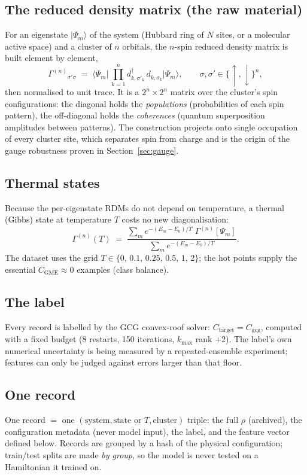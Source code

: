 \documentclass[11pt]{article}
\newcommand{\CGME}{\ensuremath{C_{\mathrm{GME}}}}
\newcommand{\rdm}{\ensuremath{\Gamma^{(n)}}}
\begin{document}
\subsection{The reduced density matrix (the raw material)}
For an eigenstate $|\Psi_m\rangle$ of the system (Hubbard ring of $N$ sites,
or a molecular active space) and a cluster of $n$ orbitals, the $n$-spin
reduced density matrix is built element by element,
\[
  \rdm_{\sigma'\sigma}
  \;=\;\Big\langle\Psi_m\Big|\,\prod_{k=1}^{n}
     d^{\dagger}_{k,\sigma'_k}\,d^{\phantom\dagger}_{k,\sigma_k}
     \Big|\Psi_m\Big\rangle ,
  \qquad \sigma,\sigma'\in\{\uparrow,\downarrow\}^{n},
\]
then normalised to unit trace. It is a $2^n\times 2^n$ matrix over the
cluster's spin configurations: the diagonal holds the \emph{populations}
(probabilities of each spin pattern), the off-diagonal holds the
\emph{coherences} (quantum superposition amplitudes between patterns). The
construction projects onto single occupation of every cluster site, which
separates spin from charge and is the origin of the gauge robustness proven
in Section~\ref{sec:gauge}.

\subsection{Thermal states}
Because the per-eigenstate RDMs do not depend on temperature, a thermal
(Gibbs) state at temperature $T$ costs no new diagonalisation:
\[
  \rdm(T)\;=\;\frac{\sum_m e^{-(E_m-E_0)/T}\;\rdm[\Psi_m]}
                   {\sum_m e^{-(E_m-E_0)/T}} .
\]
The dataset uses the grid $T\in\{0,\,0.1,\,0.25,\,0.5,\,1,\,2\}$; the hot
points supply the essential $\CGME\approx0$ examples (class balance).

\subsection{The label}
Every record is labelled by the GCG convex-roof solver:
$C_{\mathrm{target}}=C_{\mathrm{gcg}}$, computed with a fixed budget
(8 restarts, 150 iterations, $k_{\max}$ rank $+2$). The label's own
numerical uncertainty is being measured by a repeated-ensemble experiment;
features can only be judged against errors larger than that floor.

\subsection{One record}
One record $=$ one $(\text{system},\text{state or }T,\text{cluster})$ triple:
the full $\rho$ (archived), the configuration metadata (never model input),
the label, and the feature vector defined below. Records are grouped by a
hash of the physical configuration; train/test splits are made \emph{by
group}, so the model is never tested on a Hamiltonian it trained on.
\end{document}
